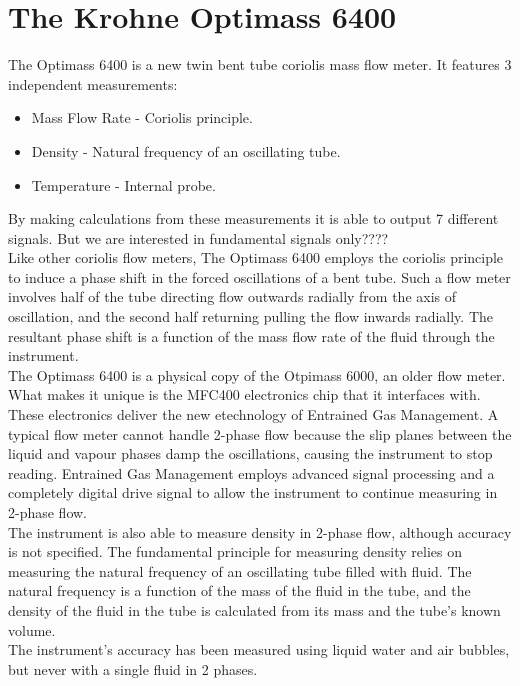 \documentclass{report}
\begin{document}
\section{The Krohne Optimass 6400}
The Optimass 6400 is a new twin bent tube coriolis mass flow meter. It features 3 independent measurements:
\begin{itemize}
\item{Mass Flow Rate - Coriolis principle.}
\item{Density - Natural frequency of an oscillating tube.}
\item{Temperature - Internal probe.}
\end{itemize}
By making calculations from these measurements it is able to output 7 different signals. But we are interested in fundamental signals only????\\
Like other coriolis flow meters, The Optimass 6400 employs the coriolis principle to induce a phase shift in the forced oscillations of a bent tube. Such a flow meter involves half of the tube directing flow outwards radially from the axis of oscillation, and the second half returning pulling the flow inwards radially. The resultant phase shift is a function of the mass flow rate of the fluid through the instrument. \\
The Optimass 6400 is a physical copy of the Otpimass 6000, an older flow meter. What makes it unique is the MFC400 electronics chip that it interfaces with. These electronics deliver the new etechnology of Entrained Gas Management. A typical flow meter cannot handle 2-phase flow because the slip planes between the liquid and vapour phases damp the oscillations, causing the instrument to stop reading. Entrained Gas Management employs advanced signal processing and a completely digital drive signal to allow the instrument to continue measuring in 2-phase flow.\\
The instrument is also able to measure density in 2-phase flow, although accuracy is not specified. The fundamental principle for measuring density relies on measuring the natural frequency of an oscillating tube filled with fluid. The natural frequency is a function of the mass of the fluid in the tube, and the density of the fluid in the tube is calculated from its mass and the tube's known volume.\\ The instrument's accuracy has been measured using liquid water and air bubbles, but never with a single fluid in 2 phases. \\
\end{document}
